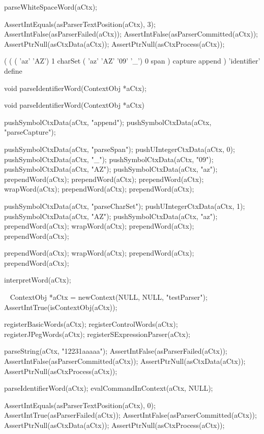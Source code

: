   parseWhiteSpaceWord(aCtx);
  
  AssertIntEquals(asParserTextPosition(aCtx), 3);
  AssertIntFalse(asParserFailed(aCtx));
  AssertIntFalse(asParserCommitted(aCtx));
  AssertPtrNull(asCtxData(aCtx));
  AssertPtrNull(asCtxProcess(aCtx));
\stopCTest
\stopTestCase
\stopTestSuite

\startTestSuite[parseIdentifierWord]

\starttyping
(
  (
    ( 'az' 'AZ') 1 charSet
    ( 'az' 'AZ' '09' '_') 0 span
  ) capture append
) 'identifier' define
\stoptyping

\startCHeader
void parseIdentifierWord(ContextObj *aCtx);
\stopCHeader

\startCCode
void parseIdentifierWord(ContextObj *aCtx) {

  pushSymbolCtxData(aCtx, "append");
  pushSymbolCtxData(aCtx, "parseCapture");

  pushSymbolCtxData(aCtx, "parseSpan");
  pushUIntegerCtxData(aCtx, 0);
  pushSymbolCtxData(aCtx, "_");
  pushSymbolCtxData(aCtx, "09");
  pushSymbolCtxData(aCtx, "AZ");
  pushSymbolCtxData(aCtx, "az");
  prependWord(aCtx);
  prependWord(aCtx);
  prependWord(aCtx);
  wrapWord(aCtx);
  prependWord(aCtx);
  prependWord(aCtx);

  pushSymbolCtxData(aCtx, "parseCharSet");
  pushUIntegerCtxData(aCtx, 1);
  pushSymbolCtxData(aCtx, "AZ");
  pushSymbolCtxData(aCtx, "az");
  prependWord(aCtx);
  wrapWord(aCtx);
  prependWord(aCtx);
  prependWord(aCtx);
  
  prependWord(aCtx);
  wrapWord(aCtx);
  prependWord(aCtx);
  prependWord(aCtx);
  
  interpretWord(aCtx);
}
\stopCCode

\CTestsSuiteSetup\
\startCTest
  ContextObj *aCtx = newContext(NULL, NULL, "testParser");
  AssertIntTrue(isContextObj(aCtx));
  
  registerBasicWords(aCtx);
  registerControlWords(aCtx);
  registerJPegWords(aCtx);
  registerSExpressionParser(aCtx);
\stopCTest

\startCTest
  parseString(aCtx, "12231aaaaa");
  AssertIntFalse(asParserFailed(aCtx));
  AssertIntFalse(asParserCommitted(aCtx));
  AssertPtrNull(asCtxData(aCtx));
  AssertPtrNull(asCtxProcess(aCtx));
  
  parseIdentifierWord(aCtx);
  evalCommandInContext(aCtx, NULL);
  
  AssertIntEquals(asParserTextPosition(aCtx), 0);
  AssertIntTrue(asParserFailed(aCtx));
  AssertIntFalse(asParserCommitted(aCtx));
  AssertPtrNull(asCtxData(aCtx));
  AssertPtrNull(asCtxProcess(aCtx));
\stopCTest
\stopTestCase

